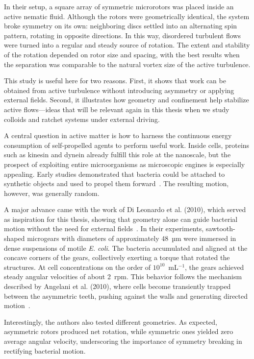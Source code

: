 In their setup, a square array of symmetric microrotors was placed inside an active nematic fluid. Although the rotors were geometrically identical, the system broke symmetry on its own: neighboring discs settled into an alternating spin pattern, rotating in opposite directions. In this way, disordered turbulent flows were turned into a regular and steady source of rotation. The extent and stability of the rotation depended on rotor size and spacing, with the best results when the separation was comparable to the natural vortex size of the active turbulence.

This study is useful here for two reasons. First, it shows that work can be obtained from active turbulence without introducing asymmetry or applying external fields. Second, it illustrates how geometry and confinement help stabilize active flows—ideas that will be relevant again in this thesis when we study colloids and ratchet systems under external driving.

A central question in active matter is how to harness the continuous energy consumption of self-propelled agents to perform useful work. Inside cells, proteins such as kinesin and dynein already fulfill this role at the nanoscale, but the prospect of exploiting entire microorganisms as microscopic engines is especially appealing. Early studies demonstrated that bacteria could be attached to synthetic objects and used to propel them forward~\cite{weibel2005microoxen, hiratsuka2006microrotary}. The resulting motion, however, was generally random.

A major advance came with the work of Di Leonardo et al. (2010), which served as inspiration for this thesis, showing that geometry alone can guide bacterial motion without the need for external fields~\cite{di2010bacterial}. In their experiments, sawtooth-shaped microgears with diameters of approximately 48~µm were immersed in dense suspensions of motile \textit{E. coli}. The bacteria accumulated and aligned at the concave corners of the gears, collectively exerting a torque that rotated the structures. At cell concentrations on the order of $10^{10}$~mL$^{-1}$, the gears achieved steady angular velocities of about 2~rpm. This behavior follows the mechanism described by Angelani et al. (2010), where cells become transiently trapped between the asymmetric teeth, pushing against the walls and generating directed motion~\cite{angelani2010geometrically}. 

Interestingly, the authors also tested different geometries. As expected, asymmetric rotors produced net rotation, while symmetric ones yielded zero average angular velocity, underscoring the importance of symmetry breaking in rectifying bacterial motion. 

